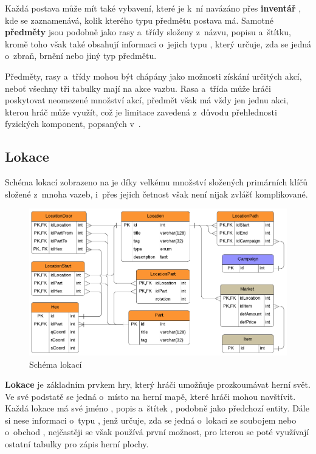 Každá postava může mít také vybavení, které je k~ní navázáno přes \textbf{inventář} , kde se zaznamenává, kolik kterého typu předmětu postava má. Samotné \textbf{předměty}  jsou podobně jako rasy a~třídy složeny z~názvu, popisu a~štítku, kromě toho však také obsahují informaci o~jejich typu , který určuje, zda se jedná o~zbraň, brnění nebo jiný typ předmětu.

Předměty, rasy a~třídy mohou být chápány jako možnosti získání určitých akcí, neboť všechny tři tabulky mají na akce vazbu. Rasa a~třída může hráči poskytovat neomezené množství akcí, předmět však má vždy jen jednu akci, kterou hráč může využít, což je limitace zavedená z~důvodu přehlednosti fyzických komponent, popsaných v~.

\subsection{Lokace}
\label{subsec:schema_location}

Schéma lokací zobrazeno na  je díky velkému množství složených primárních klíčů složené z~mnoha vazeb, i~přes jejich četnost však není nijak zvlášť komplikované.

\begin{figure}[h]
    \centering
    \includegraphics{../../shared/diagrams/er_location.pdf}
    \caption{Schéma lokací}
    \label{diag:er_location}
\end{figure}

\textbf{Lokace}  je základním prvkem hry, který hráči umožňuje prozkoumávat herní svět. Ve své podstatě se jedná o~místo na herní mapě, které hráči mohou navštívit. Každá lokace má své jméno , popis  a~štítek , podobně jako předchozí entity. Dále si nese informaci o~typu , jenž určuje, zda se jedná o~lokaci se soubojem  nebo o~obchod , nejčastěji se však používá první možnost, pro kterou se poté využívají ostatní tabulky pro zápis herní plochy.

